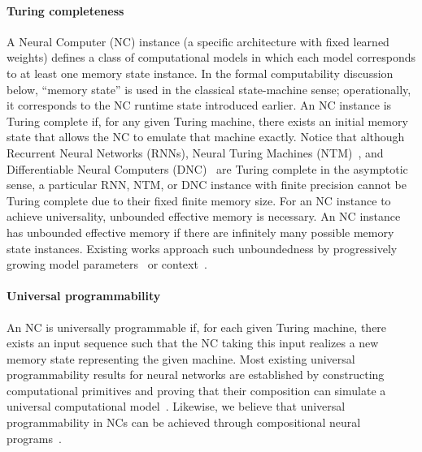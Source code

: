 \paragraph{Turing completeness}
A Neural Computer (NC) instance (a specific architecture with fixed learned weights) defines a class of computational models in which each model corresponds to at least one memory state instance.
In the formal computability discussion below, ``memory state'' is used in the classical state-machine sense; operationally, it corresponds to the NC runtime state introduced earlier.
An NC instance is Turing complete if, for any given Turing machine, there exists an initial memory state that allows the NC to emulate that machine exactly.
Notice that although Recurrent Neural Networks (RNNs), Neural Turing Machines (NTM)~\citep{graves2014neural}, and Differentiable Neural Computers (DNC)~\citep{graves2016hybrid} are Turing complete in the asymptotic sense, a particular RNN, NTM, or DNC instance with finite precision cannot be Turing complete due to their fixed finite memory size.
For an NC instance to achieve universality, unbounded effective memory is necessary.
An NC instance has unbounded effective memory if there are infinitely many possible memory state instances. 
Existing works approach such unboundedness by progressively growing model parameters~\citep{rusu2016progressive} or context~\citep{vaswani2017attention}.

\paragraph{Universal programmability}
An NC is universally programmable if, for each given Turing machine, there exists an input sequence such that the NC taking this input realizes a new memory state representing the given machine.
Most existing universal programmability results for neural networks are established by constructing computational primitives and proving that their composition can simulate a universal computational model~\citep{reed2015neural}.
Likewise, we believe that universal programmability in NCs can be achieved through compositional neural programs~\citep{pierrot2019learning}.


